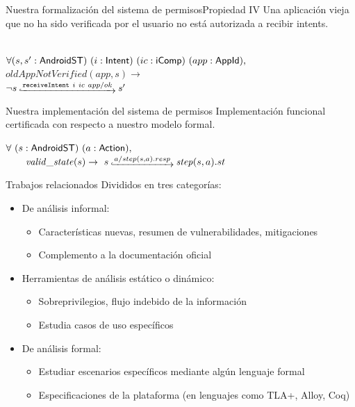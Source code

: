 \documentclass[pdf, handout]{beamer} %
\begin{document}
\begin{frame}{Nuestra formalización del sistema de permisos}{Propiedad IV}
    Una aplicación vieja que no ha sido verificada por el usuario no está autorizada a recibir intents.
    \pause \vspace{20px}
    \begin{prop} \mbox{} \\
        $\forall (s,s': \mathsf{AndroidST})~(i:\mathsf{Intent})~(ic:\mathsf{iComp})~(app:\mathsf{AppId}),$ \\
        $oldAppNotVerified(app, s) \rightarrow$ \\
        $\neg \Mathexecrel{s}{\texttt{receiveIntent}~i~ic~app/ok}{s'}$
    \end{prop}
\end{frame}


\begin{frame}{Nuestra implementación del sistema de permisos}
    Implementación funcional certificada con respecto a nuestro modelo formal.
    \pause \vspace{20px}
    \begin{theorem}
        $ \forall\ (s:\AndroidState)\ (a:\Action),$ \\
        $\quad \quad \ap{valid\_state}{s} \rightarrow\ s\step{a/step(s,a).resp} \bap{step}{s}{a}.st$
    \end{theorem}
\end{frame}

\begin{frame}{Trabajos relacionados}
    Divididos en tres categorías:
    \pause
    \begin{itemize}[<+->]
        \item De análisis informal:
              \begin{itemize}
                  \item Características nuevas, resumen de vulnerabilidades, mitigaciones
                  \item Complemento a la documentación oficial
              \end{itemize}
        \item Herramientas de análisis estático o dinámico:
              \begin{itemize}
                  \item Sobreprivilegios, flujo indebido de la información
                  \item Estudia casos de uso específicos
              \end{itemize}
        \item De análisis formal:
              \begin{itemize}
                  \item Estudiar escenarios específicos mediante algún lenguaje formal
                  \item Especificaciones de la plataforma (en lenguajes como TLA+, Alloy, Coq)
              \end{itemize}
    \end{itemize}
\end{frame}
\end{document}
